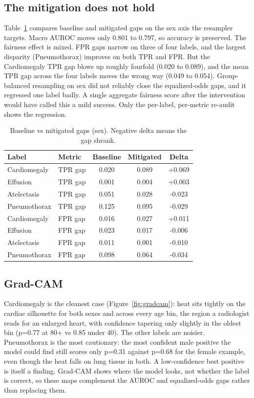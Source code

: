\documentclass[11pt]{article}
\begin{document}
\subsection{The mitigation does not hold}

Table~\ref{tab:mit} compares baseline and mitigated gaps on the sex axis the resampler targets. Macro AUROC moves only 0.801 to 0.797, so accuracy is preserved. The fairness effect is mixed. FPR gaps narrow on three of four labels, and the largest disparity (Pneumothorax) improves on both TPR and FPR. But the Cardiomegaly TPR gap blows up roughly fourfold (0.020 to 0.089), and the mean TPR gap across the four labels moves the wrong way (0.049 to 0.054). Group-balanced resampling on sex did not reliably close the equalized-odds gaps, and it regressed one label badly. A single aggregate fairness score after the intervention would have called this a mild success. Only the per-label, per-metric re-audit shows the regression.

\begin{table}[h]
\centering
\caption{Baseline vs mitigated gaps (sex). Negative delta means the gap shrank.}
\label{tab:mit}
\begin{tabular}{llccc}
\toprule
Label & Metric & Baseline & Mitigated & Delta \\
\midrule
Cardiomegaly & TPR gap & 0.020 & 0.089 & +0.069 \\
Effusion     & TPR gap & 0.001 & 0.004 & +0.003 \\
Atelectasis  & TPR gap & 0.051 & 0.028 & -0.023 \\
Pneumothorax & TPR gap & 0.125 & 0.095 & -0.029 \\
Cardiomegaly & FPR gap & 0.016 & 0.027 & +0.011 \\
Effusion     & FPR gap & 0.023 & 0.017 & -0.006 \\
Atelectasis  & FPR gap & 0.011 & 0.001 & -0.010 \\
Pneumothorax & FPR gap & 0.098 & 0.064 & -0.034 \\
\bottomrule
\end{tabular}
\end{table}

\subsection{Grad-CAM}

Cardiomegaly is the cleanest case (Figure~\ref{fig:gradcam}): heat sits tightly on the cardiac silhouette for both sexes and across every age bin, the region a radiologist reads for an enlarged heart, with confidence tapering only slightly in the oldest bin (p=0.77 at 80+ vs 0.85 under 40). The other labels are noisier. Pneumothorax is the most cautionary: the most confident male positive the model could find still scores only p=0.31 against p=0.68 for the female example, even though the heat falls on lung tissue in both. A low-confidence best positive is itself a finding. Grad-CAM shows where the model looks, not whether the label is correct, so these maps complement the AUROC and equalized-odds gaps rather than replacing them.
\end{document}

